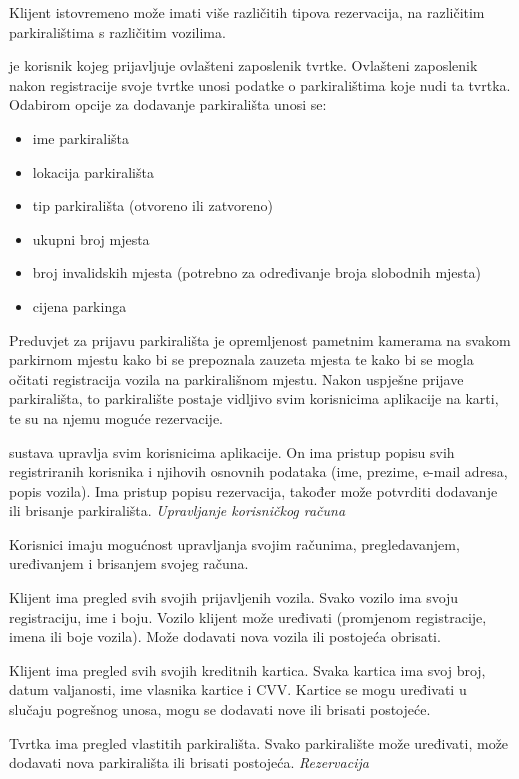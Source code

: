 Klijent istovremeno može imati više različitih tipova rezervacija, na različitim parkiralištima s različitim vozilima.
\newline

\textit{} je korisnik kojeg prijavljuje ovlašteni zaposlenik tvrtke. Ovlašteni zaposlenik nakon registracije svoje tvrtke unosi podatke o parkiralištima koje nudi ta tvrtka. Odabirom opcije za dodavanje parkirališta unosi se:
\begin{itemize}
    \item ime parkirališta
    \item lokacija parkirališta
    \item tip parkirališta (otvoreno ili zatvoreno)
    \item ukupni broj mjesta 
    \item broj invalidskih mjesta (potrebno za određivanje broja slobodnih mjesta)
    \item cijena parkinga
\end{itemize}
 Preduvjet za prijavu parkirališta je opremljenost pametnim kamerama na svakom parkirnom mjestu kako bi se prepoznala zauzeta mjesta te kako bi se mogla očitati registracija vozila na parkirališnom mjestu. Nakon uspješne prijave parkirališta, to parkiralište postaje vidljivo svim korisnicima aplikacije na karti, te su na njemu moguće rezervacije.
\newline

\textit{} sustava upravlja svim korisnicima aplikacije. On ima pristup popisu svih registriranih korisnika i njihovih osnovnih podataka (ime, prezime, e-mail adresa, popis vozila). Ima pristup popisu rezervacija,
također može potvrditi dodavanje ili brisanje parkirališta.
\newpage\textit{Upravljanje korisničkog računa}

Korisnici imaju mogućnost upravljanja svojim računima, pregledavanjem, uređivanjem i brisanjem svojeg računa.

Klijent ima pregled svih svojih prijavljenih vozila. Svako vozilo ima svoju registraciju, ime i boju. Vozilo klijent može uređivati (promjenom registracije, imena ili boje vozila). Može dodavati nova vozila ili postojeća obrisati. 

Klijent ima pregled svih svojih kreditnih kartica. Svaka kartica ima svoj broj, datum valjanosti, ime vlasnika kartice i CVV. Kartice se mogu uređivati u slučaju pogrešnog unosa, mogu se dodavati nove ili brisati postojeće.

Tvrtka ima pregled vlastitih parkirališta. Svako parkiralište može uređivati, može dodavati nova parkirališta ili brisati postojeća. 
\newline
\newline
\textit{Rezervacija}

